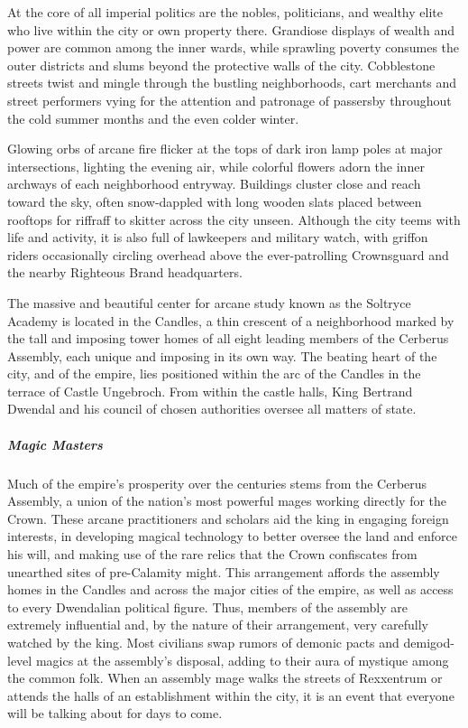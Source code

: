 \documentclass[10pt,a4paper,twoside,bg=print,twocolumn,openany,nodeprecatedcode]{dndbook}
\begin{document}
At the core of all imperial politics are the nobles, politicians, and wealthy elite who live within the city or own property there. Grandiose displays of wealth and power are common among the inner wards, while sprawling poverty consumes the outer districts and slums beyond the protective walls of the city. Cobblestone streets twist and mingle through the bustling neighborhoods, cart merchants and street performers vying for the attention and patronage of passersby throughout the cold summer months and the even colder winter.

Glowing orbs of arcane fire flicker at the tops of dark iron lamp poles at major intersections, lighting the evening air, while colorful flowers adorn the inner archways of each neighborhood entryway. Buildings cluster close and reach toward the sky, often snow-dappled with long wooden slats placed between rooftops for riffraff to skitter across the city unseen. Although the city teems with life and activity, it is also full of lawkeepers and military watch, with griffon riders occasionally circling overhead above the ever-patrolling Crownsguard and the nearby Righteous Brand headquarters.

The massive and beautiful center for arcane study known as the Soltryce Academy is located in the Candles, a thin crescent of a neighborhood marked by the tall and imposing tower homes of all eight leading members of the Cerberus Assembly, each unique and imposing in its own way. The beating heart of the city, and of the empire, lies positioned within the arc of the Candles in the terrace of Castle Ungebroch. From within the castle halls, King Bertrand Dwendal and his council of chosen authorities oversee all matters of state.

\subparagraph{Magic Masters}
Much of the empire's prosperity over the centuries stems from the Cerberus Assembly, a union of the nation's most powerful mages working directly for the Crown. These arcane practitioners and scholars aid the king in engaging foreign interests, in developing magical technology to better oversee the land and enforce his will, and making use of the rare relics that the Crown confiscates from unearthed sites of pre-Calamity might. This arrangement affords the assembly homes in the Candles and across the major cities of the empire, as well as access to every Dwendalian political figure. Thus, members of the assembly are extremely influential and, by the nature of their arrangement, very carefully watched by the king. Most civilians swap rumors of demonic pacts and demigod-level magics at the assembly's disposal, adding to their aura of mystique among the common folk. When an assembly mage walks the streets of Rexxentrum or attends the halls of an establishment within the city, it is an event that everyone will be talking about for days to come.
\end{document}
